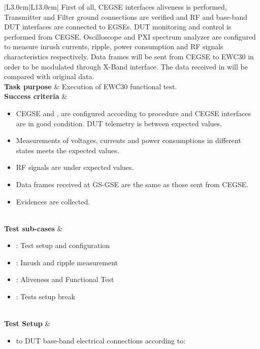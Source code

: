 \begin{table}[H]
\begin{tabular}{|L{3.0cm}|L{13.0cm}|}
		First of all, CEGSE interfaces aliveness is performed,
  Transmitter and Filter ground connections are verified and 
   RF and base-band DUT interfaces are connected to EGSEs.
   DUT monitoring and control is performed from CEGSE{}.
  Oscilloscope and PXI spectrum analyzer are configured 
  to measure inrush currents, ripple, power consumption and RF signals characteristics respectively.
Data frames will be sent from CEGSE to EWC30 in order to be modulated through X-Band interface. 
 The data received in \fmr{} will be compared with 
 original data.\\
		\hline
		\textbf{Task purpose} & Execution of EWC30 functional test. \\
		\hline
		\textbf{Success criteria} & 			\begin{minipage}[t]{\linewidth}
			\begin{itemize}[nosep,after=\strut]
		\item CEGSE and \fmr{}, are configured according to procedure and CEGSE interfaces are in good condition.
DUT telemetry is between expected values.
	\item Measurements of voltages, currents and power consumptions in different states meets the expected values.
	\item RF signals are under expected values.
	\item Data frames received at GS-GSE are the same as those sent from CEGSE.
	\item Evidences are collected. 
				\end{itemize}
		\end{minipage}\\
		\hline
		\textbf{Test sub-cases} & 
\begin{minipage}[t]{\linewidth}
		\begin{itemize}[nosep,after=\strut]
		\item {}: Test setup and configuration
		\item {}: Inrush and ripple measurement 
		\item {}: Aliveness and Functional Test
		\item {}: Tests setup break
		\end{itemize}
		\end{minipage}\\
		\hline
		\textbf{Test Setup} &
\begin{minipage}[t]{\linewidth}
	\begin{itemize}[nosep,after=\strut]
		\item \comEgse\xspace to DUT base-band electrical connections according to:

\end{itemize}
\end{minipage}
\end{tabular}
\end{table}
